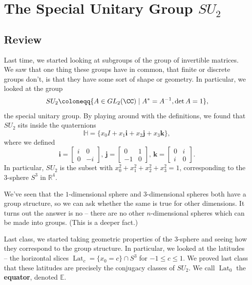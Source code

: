\newpage


\section{The Special Unitary Group \texorpdfstring{$SU_2$}{SU2}}

\subsection{Review}

Last time, we started looking at subgroups of the group of invertible matrices. We saw that one thing these groups have in common, that finite or discrete groups don't, is that they have some sort of shape or geometry. In particular, we looked at the group \[SU_2 \coloneqq \{A \in GL_2(\CC) \mid A^* = A^{-1}, \det A = 1\},\] the special unitary group. By playing around with the definitions, we found that $SU_2$ sits inside the quaternions \[\mathbb{H} = \{x_0I + x_1\mathbf{i} + x_2\mathbf{j} + x_3\mathbf{k}\},\] where we defined \[ \mathbf{i} = \begin{bmatrix} i & 0 \\ 0 & -i \end{bmatrix}, \, \mathbf{j} = \begin{bmatrix}0 & 1 \\ -1 & 0 \end{bmatrix}, \, \mathbf{k} = \begin{bmatrix} 0 & i \\ i & 0 \end{bmatrix} . \] In particular, $SU_2$ is the subset with $x_0^2 + x_1^2 + x_2^2 + x_3^2 = 1$, corresponding to the $3$-sphere $S^3$ in $\mathbb{R}^4$. 

\begin{note}
We've seen that the $1$-dimensional sphere and $3$-dimensional spheres both have a group structure, so we can ask whether the same is true for other dimensions. It turns out the answer is no -- there are no other $n$-dimensional spheres which can be made into groups. (This is a deeper fact.)
\end{note}

Last class, we started taking geometric properties of the $3$-sphere and seeing how they correspond to the group structure. In particular, we looked at the latitudes -- the horizontal slices $\operatorname{Lat}_c = \{x_0 = c\} \cap S^3$ for $-1 \leq c \leq 1$. We proved last class that these latitudes are precisely the conjugacy classes of $SU_2$. We call $\operatorname{Lat}_0$ the \textbf{equator}, denoted $\mathbb{E}$. 

